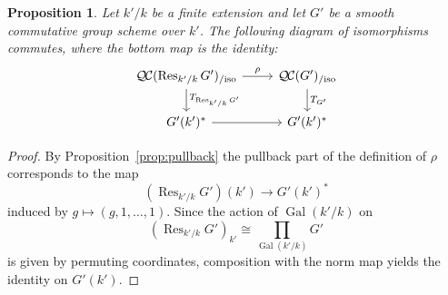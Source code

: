 \documentclass{amsart}
\theoremstyle{plain}
\newtheorem{proposition}[theorem]{Proposition}
\theoremstyle{definition}
\theoremstyle{remark}
\DeclareMathOperator{\Gal}{Gal}
\DeclareMathOperator{\Res}{Res}
\newcommand{\QC}{{\mathcal{Q\hskip-0.8pt C}}}
\newcommand{\QCiso}[1]{\QC(#1)_{/\text{iso}}}
\newcommand{\TrFrob}[1]{T_{#1}}
\begin{document}
\begin{proposition}
Let $k'/k$ be a finite extension and let $G'$ be a smooth commutative group scheme over $k'$.
The following diagram of isomorphisms commutes, where the bottom map is the identity:
\[
\begin{tikzcd}
\QCiso{\Res_{k'/k} G'} \dar{\TrFrob{\Res_{k'/k} G'}} \rar{\rho} & \QCiso{G'} \dar{\TrFrob{G'}}\\
G'(k')^* \rar & G'(k')^*
\end{tikzcd}
\]
\end{proposition}
\begin{proof}
By Proposition~\ref{prop:pullback} the pullback part of the definition of $\rho$ corresponds to the map
\[
(\Res_{k'/k}G')(k') \to G'(k')^*
\]
induced by $g \mapsto (g, 1, \ldots, 1)$.  Since the action of $\Gal(k'/k)$ on
\[
(\Res_{k'/k}G')_{k'} \cong \prod_{\Gal(k'/k)} G'
\]
is given by permuting coordinates, composition with the norm map yields the identity on $G'(k')$.
\end{proof}




\end{document}
